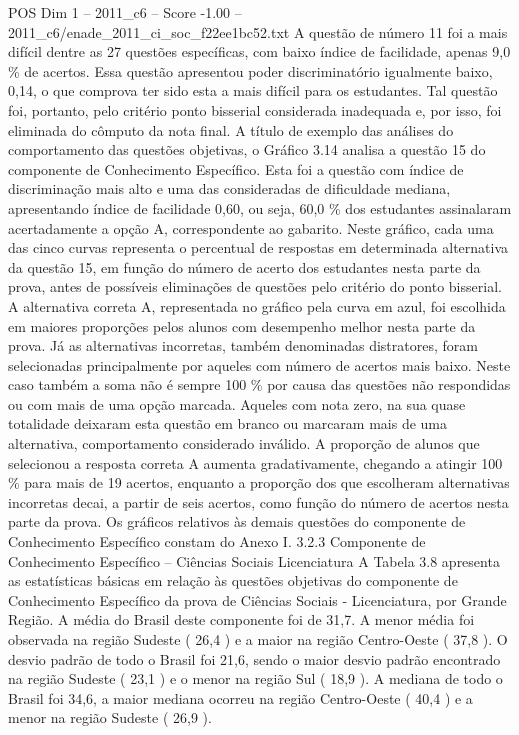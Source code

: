 \begin{textsample}{POS Dim 1 – 2011\_c6 – Score -1.00 – 2011\_c6/enade\_2011\_ci\_soc\_f22ee1bc52.txt}
A questão de número 11 foi a mais difícil dentre as 27 questões específicas, com baixo índice de facilidade, apenas 9,0 \% de acertos.
Essa questão apresentou poder discriminatório igualmente baixo, 0,14, o que comprova ter sido esta a mais difícil para os estudantes.
Tal questão foi, portanto, pelo critério ponto bisserial considerada inadequada e, por isso, foi eliminada do cômputo da nota final.
A título de exemplo das análises do comportamento das questões objetivas, o Gráfico 3.14 analisa a questão 15 do componente de Conhecimento Específico.
Esta foi a questão com índice de discriminação mais alto e uma das consideradas de dificuldade mediana, apresentando índice de facilidade 0,60, ou seja, 60,0 \% dos estudantes assinalaram acertadamente a opção A, correspondente ao gabarito.
Neste gráfico, cada uma das cinco curvas representa o percentual de respostas em determinada alternativa da questão 15, em função do número de acerto dos estudantes nesta parte da prova, antes de possíveis eliminações de questões pelo critério do ponto bisserial.
A alternativa correta A, representada no gráfico pela curva em azul, foi escolhida em maiores proporções pelos alunos com desempenho melhor nesta parte da prova.
Já as alternativas incorretas, também denominadas distratores, foram selecionadas principalmente por aqueles com número de acertos mais baixo.
Neste caso também a soma não é sempre 100 \% por causa das questões não respondidas ou com mais de uma opção marcada.
Aqueles com nota zero, na sua quase totalidade deixaram esta questão em branco ou marcaram mais de uma alternativa, comportamento considerado inválido.
A proporção de alunos que selecionou a resposta correta A aumenta gradativamente, chegando a atingir 100 \% para mais de 19 acertos, enquanto a proporção dos que escolheram alternativas incorretas decai, a partir de seis acertos, como função do número de acertos nesta parte da prova.
Os gráficos relativos às demais questões do componente de Conhecimento Específico constam do Anexo I. 3.2.3 Componente de Conhecimento Específico – Ciências Sociais Licenciatura A Tabela 3.8 apresenta as estatísticas básicas em relação às questões objetivas do componente de Conhecimento Específico da prova de Ciências Sociais - Licenciatura, por Grande Região.
A média do Brasil deste componente foi de 31,7.
A menor média foi observada na região Sudeste ( 26,4 ) e a maior na região Centro-Oeste ( 37,8 ).
O desvio padrão de todo o Brasil foi 21,6, sendo o maior desvio padrão encontrado na região Sudeste ( 23,1 ) e o menor na região Sul ( 18,9 ).
A mediana de todo o Brasil foi 34,6, a maior mediana ocorreu na região Centro-Oeste ( 40,4 ) e a menor na região Sudeste ( 26,9 ).

\end{textsample}
